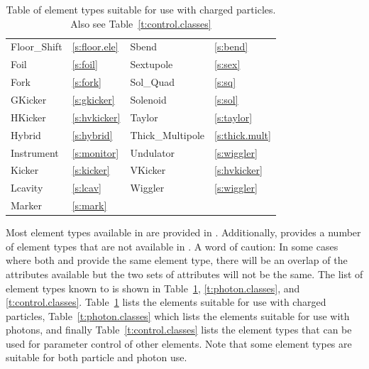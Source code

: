 \begin{table}[htb]
{\begin{tabular}{llll}
  Floor_Shift       & \ref{s:floor.ele}     &  Sbend             & \ref{s:bend}       \\
  Foil              & \ref{s:foil}          &  Sextupole         & \ref{s:sex}        \\
  Fork              & \ref{s:fork}          &  Sol_Quad          & \ref{s:sq}         \\
  GKicker           & \ref{s:gkicker}       &  Solenoid          & \ref{s:sol}        \\
  HKicker           & \ref{s:hvkicker}      &  Taylor            & \ref{s:taylor}     \\
  Hybrid            & \ref{s:hybrid}        &  Thick_Multipole   & \ref{s:thick.mult} \\
  Instrument        & \ref{s:monitor}       &  Undulator         & \ref{s:wiggler}    \\
  Kicker            & \ref{s:kicker}        &  VKicker           & \ref{s:hvkicker}   \\ 
  Lcavity           & \ref{s:lcav}          &  Wiggler           & \ref{s:wiggler}    \\
  Marker            & \ref{s:mark}          &                    &                    \\
  \bottomrule
\end{tabular}
} \caption{Table of element types suitable for use with charged particles. Also see
Table~\ref{t:control.classes}} \label{t:particle.classes}
\end{table}

Most element types available in \mad are provided in \bmad.  Additionally, \bmad provides a number
of element types that are not available in \mad.  A word of caution: In some cases where both \mad
and \bmad provide the same element type, there will be an overlap of the attributes available but
the two sets of attributes will not be the same.  The list of element types known to \bmad is shown
in Table~\ref{t:particle.classes}, \ref{t:photon.classes}, and \ref{t:control.classes}.
Table~\ref{t:particle.classes} lists the elements suitable for use with charged particles,
Table~\ref{t:photon.classes} which lists the elements suitable for use with photons, and finally
Table~\ref{t:control.classes} lists the  element types that can be used for parameter
control of other elements. Note that some element types are suitable for both particle and photon
use.

